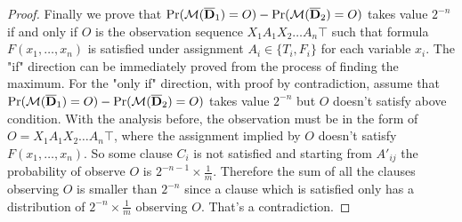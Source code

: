 \begin{proof}
  Finally we prove that  $\Pr (\mathcal{M} (\overline{\mathbf{D}}_1) = O) - \Pr (\mathcal{M} (\overline{\mathbf{D}}_2) = O)$ takes value $2^{-n}$
  if and only if $O$ is the observation sequence $X_1A_1X_2\ldots A_n \top$ such that
  formula $F(x_1,\ldots,x_n)$ is satisfied under assignment $A_i \in \{T_i,F_i\}$ for each variable $x_i$.
  The "if" direction can be immediately proved from the process of finding the maximum.
  For the "only if" direction, with proof by contradiction, assume that $\Pr (\mathcal{M} (\overline{\mathbf{D}}_1) = O) - \Pr (\mathcal{M} (\overline{\mathbf{D}}_2) = O)$ takes
  value $2^{-n}$ but $O$ doesn't satisfy above condition. With the analysis before, the observation must be in the form 
  of $O=X_1A_1X_2\ldots A_n \top$, where the assignment implied by $O$ doesn't satisfy $F(x_1,\ldots,x_n)$.
  So some clause $C_i$ is not satisfied and starting from $A'_{ij}$ the probability of
  observe $O$ is $2^{-n-1}\times \frac{1}{m}$. Therefore the sum of all the clauses observing 
  $O$ is smaller than $2^{-n}$ since a clause which is satisfied only has a distribution 
  of  $2^{-n}\times \frac{1}{m}$ observing $O$. That's a contradiction.
  
\end{proof} 